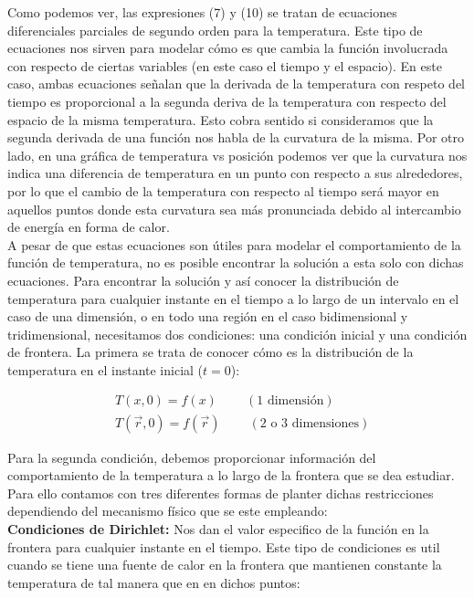 \documentclass[12pt]{article}
\begin{document}
Como podemos ver, las expresiones (7) y (10) se tratan de ecuaciones diferenciales parciales de segundo orden para la temperatura. Este tipo de ecuaciones nos sirven para modelar cómo es que cambia la función involucrada con respecto de ciertas variables (en este caso el tiempo y el espacio). En este caso, ambas ecuaciones señalan que la derivada de la temperatura con respeto del tiempo es proporcional a la segunda deriva de la temperatura con respecto del espacio de la misma temperatura. Esto cobra sentido si consideramos que la segunda derivada de una función nos habla de la curvatura de la misma. Por otro lado, en una gráfica de temperatura vs posición podemos ver que la curvatura nos indica una diferencia de temperatura en un punto con respecto a sus alrededores, por lo que el cambio de la temperatura con respecto al tiempo será mayor en aquellos puntos donde esta curvatura sea más pronunciada debido al intercambio de energía en forma de calor. \\

A pesar de que estas ecuaciones son útiles para modelar el comportamiento de la función de temperatura, no es posible encontrar la solución a esta solo con dichas ecuaciones. Para encontrar la solución y así conocer la distribución de temperatura para cualquier instante en el tiempo a lo largo de un intervalo en el caso de una dimensión, o en todo una región en el caso bidimensional y tridimensional, necesitamos dos condiciones: una condición inicial y una condición de frontera. La primera se trata de conocer cómo es la distribución de la temperatura en el instante inicial ($t=0$):

\begin{align*}
    & T(x,0) = f(x) \;\;\;\;\;\;\;\; (\text{1 dimensión}) \\
    &T(\vec{r},0) = f(\vec{r}) \;\;\;\;\;\;\;\; (\text{2 o 3 dimensiones})
\end{align*}

Para la segunda condición, debemos proporcionar información del comportamiento de la temperatura a lo largo de la frontera que se dea estudiar. Para ello contamos con tres  diferentes formas de planter dichas restricciones dependiendo del mecanismo físico que se este empleando: \\

\textbf{Condiciones de Dirichlet: }Nos dan el valor especifico de la función en la frontera para cualquier instante en el tiempo. Este tipo de condiciones es util cuando se tiene una fuente de calor en la frontera que mantienen constante la temperatura de tal manera que en en dichos puntos:
\end{document}
